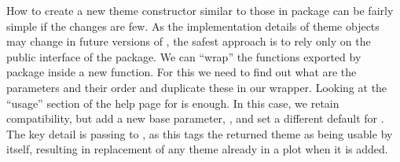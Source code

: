 \documentclass[krantz2]{krantz}\usepackage{knitr}%
\begin{document}
\begin{explainbox}
How to create a new theme constructor similar to those in package \ggplot can be fairly simple if the changes are few. As the implementation details of theme objects may change in future versions of \ggplot, the safest approach is to rely only on the public interface of the package. We can ``wrap'' the functions exported by package \ggplot inside a new function. For this we need to find out what are the parameters and their order and duplicate these in our wrapper. Looking at the ``usage'' section of the help page for  is enough. In this case, we retain compatibility, but add a new base parameter, , and set a different default for . The key detail is passing  to , as this tags the returned theme as being usable by itself, resulting in replacement of any theme already in a plot when it is added.

\begin{knitrout}\footnotesize
{}\color{fgcolor}\begin{kframe}
\begin{alltt}
 \hlkwb{<-}
   \hlstd{(} \hlstd{=} \hlstd{,}
             \hlstd{=} \hlstd{,}
             \hlopt{/}\hlstd{,}
             \hlopt{/}\hlstd{,}
             \hlstd{=} \hlstd{) \{}
    \hlstd{(} 
                
                
                 \hlopt{+}
    \hlstd{(} \hlstd{=} \hlstd{(} 
           \hlstd{=} \hlstd{(} 
           \hlstd{=} \hlstd{(} 
           \hlstd{=} \hlstd{(} 
           \hlstd{=} \hlstd{(}   \hlstd{=} \hlstd{)}
  \hlstd{\}}
\end{alltt}
\end{kframe}
\end{knitrout}


\end{explainbox}
\end{document}
